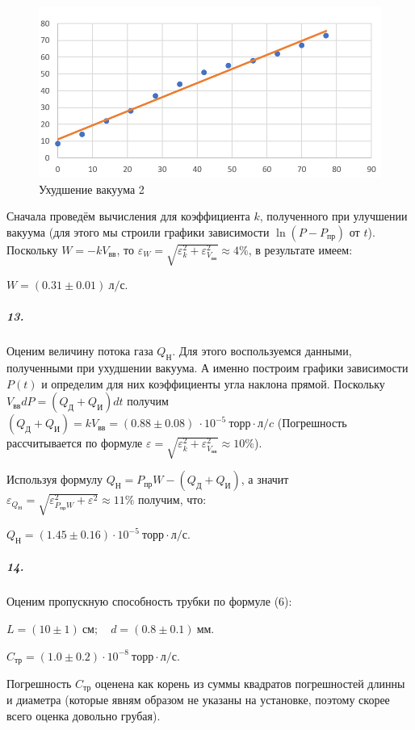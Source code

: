 \documentclass[a4paper,12pt]{article}
\begin{document}
\begin{figure} [h!]
	\caption{Ухудшение  вакуума 2}
	\centering 
	\includegraphics[scale=0.8]{Ухудшение2.png} 
\end{figure}

Сначала проведём вычисления для коэффициента $k$, полученного при улучшении вакуума (для этого мы строили графики зависимости $\ln (P-P_{пр})$ от $t$). Поскольку $W = -kV_{вв}$, то $\varepsilon_W = \sqrt{\varepsilon_k^2 + \varepsilon_{V_{вв}}^2} \approx 4\%$, в результате имеем: 

$
W = (0.31 \pm 0.01) ~ л /с.
$


\subparagraph*{13.} Оценим величину потока газа  $Q_Н$. Для этого воспользуемся данными, полученными при ухудшении вакуума. А именно построим графики зависимости $P(t)$ и определим для них коэффициенты угла наклона прямой. Поскольку $V_{вв}dP = (Q_Д + Q_И) dt$ получим $(Q_Д + Q_И) = kV_{вв} = (0.88 \pm 0.08)~ \cdot 10^{-5} ~торр \cdot л / c $ (Погрешность рассчитывается по формуле $\varepsilon =  \sqrt{\varepsilon_k^2 + \varepsilon_{V_{вв}}^2} \approx 10\%$). 


 Используя формулу $Q_Н = P_{пр}W - (Q_Д + Q_И)$, а значит $\varepsilon_{Q_Н} =  \sqrt{\varepsilon_{P_{пр}W}^2 + \varepsilon^2} \approx 11\%$ получим, что: 
 
 $
 Q_Н = (1.45 \pm 0.16) \cdot 10^{-5} ~ торр \cdot л / с.
 $
 
 

\subparagraph*{14.} Оценим пропускную способность трубки по формуле (6):

$
L = (10 \pm 1)~ см; \quad   d = (0.8 \pm 0.1) ~ мм.
$ 

$
C_{тр} = (1.0 \pm 0.2)\cdot 10^{-8} ~ торр \cdot л / с.
$
 
Погрешность $C_{тр}$  оценена как корень из суммы квадратов погрешностей длинны и диаметра (которые явням образом не указаны на установке, поэтому скорее всего оценка довольно грубая). 
\end{document}
